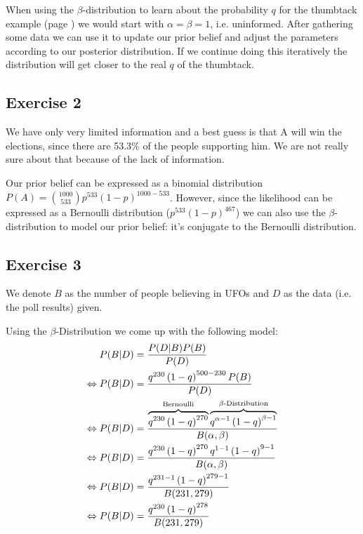 \bigskip

When using the $\beta$-distribution to learn about the probability $q$ for the thumbtack example (page \pageref{example:Thumbtack Toss}) we would start with $\alpha=\beta=1$, i.e. uninformed. After gathering some data we can use it to update our prior belief and adjust the parameters according to our posterior distribution. If we continue doing this iteratively the distribution will get closer to the real $q$ of the thumbtack.


\subsection*{Exercise 2}
We have only very limited information and a best guess is that A will win the elections, since there are 53.3\% of the people supporting him. We are not really sure about that because of the lack of information.

Our prior belief can be expressed as a binomial distribution $P(A) = {1000 \choose 533} p^{533}(1-p)^{1000-533}$. However, since the likelihood can be expressed as a Bernoulli distribution ($p^{533}(1-p)^{467}$) we can also use the $\beta$-distribution to model our prior belief: it's conjugate to the Bernoulli distribution.

\subsection*{Exercise 3}
We denote $B$ as the number of people believing in UFOs and $D$ as the data (i.e. the poll results) given.

Using the $\beta$-Distribution we come up with the following model:
\begin{align*}\index{Bernoulli Distribution}
                P(B|D) &= \frac{P(D|B)P(B)}{P(D)} \\
\Leftrightarrow P(B|D) &= \frac{q^{230}\left(1-q\right)^{500-230}P(B)}{P(D)}\\
\Leftrightarrow P(B|D) &= \frac{\overbrace{q^{230}\left(1-q\right)^{270}}^\text{Bernoulli} \overbrace{q^{\alpha-1}\left(1-q\right)^{\beta-1}}^\text{$\beta$-Distribution}}{B(\alpha,\beta)} \\
\Leftrightarrow P(B|D) &= \frac{q^{230}\left(1-q\right)^{270} q^{1-1}\left(1-q\right)^{9-1}}{B(\alpha,\beta)} \\
\Leftrightarrow P(B|D) &= \frac{q^{231-1}\left(1-q\right)^{279-1}}{B(231,279)} \\
\Leftrightarrow P(B|D) &= \frac{q^{230}\left(1-q\right)^{278}}{B(231,279)}
\end{align*}

